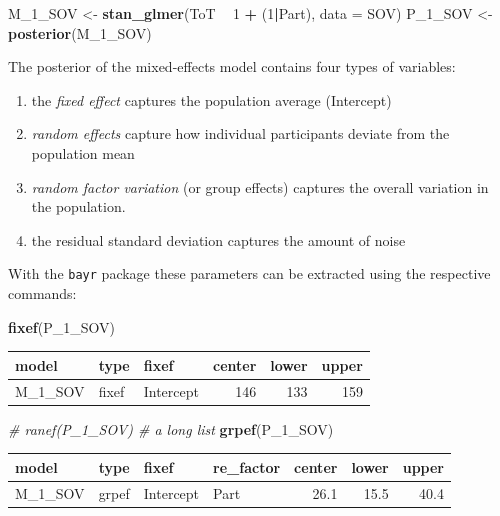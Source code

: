\documentclass[]{svmono}
\newenvironment{Shaded}{\begin{snugshade}}{\end{snugshade}}
\newcommand{\KeywordTok}[1]{\textcolor[rgb]{0.13,0.29,0.53}{\textbf{#1}}}
\newcommand{\DataTypeTok}[1]{\textcolor[rgb]{0.13,0.29,0.53}{#1}}
\newcommand{\DecValTok}[1]{\textcolor[rgb]{0.00,0.00,0.81}{#1}}
\newcommand{\StringTok}[1]{\textcolor[rgb]{0.31,0.60,0.02}{#1}}
\newcommand{\CommentTok}[1]{\textcolor[rgb]{0.56,0.35,0.01}{\textit{#1}}}
\newcommand{\OperatorTok}[1]{\textcolor[rgb]{0.81,0.36,0.00}{\textbf{#1}}}
\newcommand{\NormalTok}[1]{#1}
\providecommand{\tightlist}{%
  \setlength{\itemsep}{0pt}\setlength{\parskip}{0pt}}
\begin{document}
\begin{Shaded}
\begin{Highlighting}[]
\NormalTok{M_1_SOV <-}\StringTok{ }\KeywordTok{stan_glmer}\NormalTok{(ToT }\OperatorTok{~}\StringTok{ }\DecValTok{1} \OperatorTok{+}\StringTok{ }\NormalTok{(}\DecValTok{1}\OperatorTok{|}\NormalTok{Part), }\DataTypeTok{data =}\NormalTok{ SOV)}
\NormalTok{P_1_SOV <-}\StringTok{ }\KeywordTok{posterior}\NormalTok{(M_1_SOV)}
\end{Highlighting}
\end{Shaded}

The posterior of the mixed-effects model contains four types of
variables:

\begin{enumerate}
\def\labelenumi{\arabic{enumi}.}
\tightlist
\item
  the \emph{fixed effect} captures the population average (Intercept)
\item
  \emph{random effects} capture how individual participants deviate from
  the population mean
\item
  \emph{random factor variation} (or group effects) captures the overall
  variation in the population.
\item
  the residual standard deviation captures the amount of noise
\end{enumerate}

With the \texttt{bayr} package these parameters can be extracted using
the respective commands:

\begin{Shaded}
\begin{Highlighting}[]
\KeywordTok{fixef}\NormalTok{(P_1_SOV)}
\end{Highlighting}
\end{Shaded}

\begin{longtable}[]{@{}lllrrr@{}}
\toprule
model & type & fixef & center & lower & upper\tabularnewline
\midrule
\endhead
M\_1\_SOV & fixef & Intercept & 146 & 133 & 159\tabularnewline
\bottomrule
\end{longtable}

\begin{Shaded}
\begin{Highlighting}[]
\CommentTok{# ranef(P_1_SOV) # a long list}
\KeywordTok{grpef}\NormalTok{(P_1_SOV)}
\end{Highlighting}
\end{Shaded}

\begin{longtable}[]{@{}llllrrr@{}}
\toprule
model & type & fixef & re\_factor & center & lower &
upper\tabularnewline
\midrule
\endhead
M\_1\_SOV & grpef & Intercept & Part & 26.1 & 15.5 & 40.4\tabularnewline
\bottomrule
\end{longtable}
\end{document}
